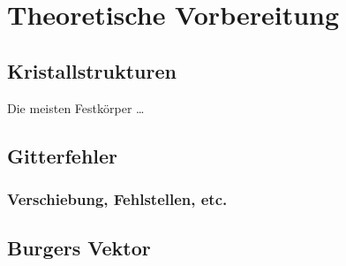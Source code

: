 \section{Theoretische Vorbereitung}
    \subsection{Kristallstrukturen}
        Die meisten Festkörper \dots
    \subsection{Gitterfehler}
        \subsubsection*{Verschiebung, Fehlstellen, etc.}
    \subsection{Burgers Vektor}
    
    \subsection{}